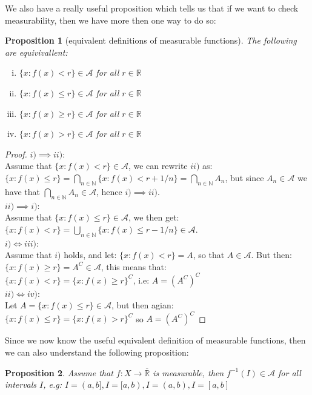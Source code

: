 \documentclass{article}
\newcommand{\R}{\mathbb{R}}
\newcommand{\N}{\mathbb{N}}
\newcommand{\A}{\mathcal{A}}
\newcommand{\Rbar}{\overline{\mathbb{R}}}%
\newtheorem{prop}{Proposition}
\newtheorem{proof}{Proof}
\begin{document}
We also have a really useful proposition which tells us that if we want to check measurability, then we have more then one way to do so: 

\begin{prop}[equivalent definitions of measurable functions]
\label{equivalent_def_of_measure}
The following are equivivallent: 
\begin{enumerate}[i)]
    \item $\{x: f(x) < r\} \in \A$ for all $r\in \R$
    \item $\{x: f(x) \leq r\} \in \A$ for all $r\in \R$
    \item $\{x: f(x) \geq r\} \in \A$ for all $r\in \R$
    \item $\{x: f(x) > r\} \in \A$ for all $r\in \R$
\end{enumerate}
\end{prop}

\begin{proof}
$i) \implies ii)$:\\ 
Assume that $\{x: f(x) < r\} \in \A$, we can rewrite $ii)$ as: $\{x: f(x) \leq r\} = \bigcap_{n\in \N}\{x: f(x) < r + 1/n\} = \bigcap_{n\in \N}A_{n}$, but since $A_{n}\in \A$ we have that $\bigcap_{n\in \N}A_{n} \in \A$, hence $i)\implies ii)$. \\ 
$ii) \implies i)$: \\ 
Assume that $\{x: f(x) \leq r\} \in \A$, we then get: \\ 
$\{x: f(x) < r\} = \bigcup_{n\in \N} \{x:f(x) \leq r -1/n\} \in \A$. \\ 
$i) \iff iii)$: \\
Assume that $i)$ holds, and let: $\{x: f(x) < r\} = A$, so that $A\in \A$. But then: $\{x: f(x) \geq r\} = A^{C} \in \A$, this means that:\\ 
$\{x: f(x) < r\} = \{x: f(x) \geq r\}^{C}$, i.e: $A=(A^{C})^{C}$ \\ 
$ii) \iff iv)$: \\ 
Let $A = \{x: f(x) \leq r\} \in \A$, but then agian: \\ 
$\{x: f(x) \leq r\} = \{x: f(x) > r\}^{C} $ so $A = (A^{C})^{C}$
\end{proof} 

Since we now know the useful equivalent definition of measurable functions, then we can also understand the following proposition: 

\begin{prop}
Assume that $f:X\to \Rbar$ is measurable, then $f^{-1}(I) \in \A$ for all intervals $I$, e.g: $I = (a,b], I=[a,b), I=(a,b), I = [a,b]$
\end{prop} 
\end{document}
